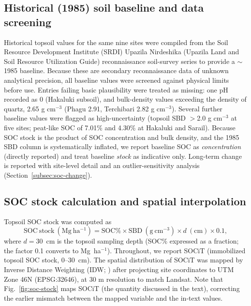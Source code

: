 \documentclass[preprint,authoryear,12pt]{elsarticle}
\begin{document}
\subsection{Historical (1985) soil baseline and data screening}
\label{subsec:baseline}
Historical topsoil values for the same nine sites were compiled from the Soil Resource
Development Institute (SRDI) Upazila Nirdeshika (Upazila Land and Soil Resource Utilization
Guide) reconnaissance soil-survey series \citep{SRDI_Nirdeshika} to provide a $\sim$1985
baseline. Because these are secondary
reconnaissance data of unknown analytical precision, all baseline values were screened
against physical limits before use. Entries failing basic plausibility were treated as
missing: one pH recorded as 0 (Hakaluki subsoil), and bulk-density values exceeding the
density of quartz, 2.65 g cm$^{-3}$ (Phagu 2.91, Terchibari 2.82 g cm$^{-3}$). Several
further baseline values were flagged as high-uncertainty (topsoil SBD $>$2.0 g cm$^{-3}$ at
five sites; peat-like SOC of 7.01\% and 4.30\% at Hakaluki and Sarail). Because SOC stock
is the product of SOC concentration and bulk density, and the 1985 SBD column is
systematically inflated, we report baseline SOC as \emph{concentration} (directly reported)
and treat baseline \emph{stock} as indicative only. Long-term change is reported with
site-level detail and an outlier-sensitivity analysis (Section~\ref{subsec:soc-change}).

\subsection{SOC stock calculation and spatial interpolation}
\label{subsec:soc-stock}
Topsoil SOC stock was computed as
\begin{equation}
\mathrm{SOC\ stock\ (Mg\ ha^{-1})} = \mathrm{SOC\%} \times \mathrm{SBD\ (g\ cm^{-3})}
\times d\ \mathrm{(cm)} \times 0.1,
\label{eq:stock}
\end{equation}
where $d = 30$~cm is the topsoil sampling depth (SOC\% expressed as a fraction; the factor
0.1 converts to Mg~ha$^{-1}$). Throughout, we report SOCiT (immobilized topsoil SOC stock,
$0$--$30$~cm). The spatial distribution of SOCiT was mapped by Inverse Distance Weighting
(IDW; \citealp{Burrough2015}) after projecting site coordinates to UTM Zone 46N (EPSG:32646),
at 30 m resolution to match Landsat. Note that Fig.~\ref{fig:soc-stock} maps SOCiT (the
quantity discussed in the text), correcting the earlier mismatch between the mapped variable
and the in-text values.
\end{document}
